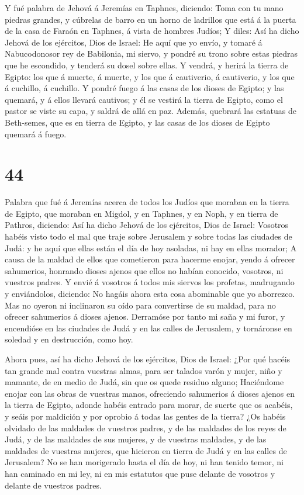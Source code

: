  Y fué palabra de Jehová á Jeremías en Taphnes, diciendo:
 Toma con tu mano piedras grandes, y cúbrelas de barro en un
horno de ladrillos que está á la puerta de la casa de Faraón en Taphnes,
á vista de hombres Judíos;  Y diles: Así ha dicho Jehová de
los ejércitos, Dios de Israel: He aquí que yo envío, y tomaré á
Nabucodonosor rey de Babilonia, mi siervo, y pondré su trono sobre estas
piedras que he escondido, y tenderá su dosel sobre ellas. 
Y vendrá, y herirá la tierra de Egipto: los que á muerte, á muerte, y
los que á cautiverio, á cautiverio, y los que á cuchillo, á cuchillo.
 Y pondré fuego á las casas de los dioses de Egipto; y las
quemará, y á ellos llevará cautivos; y él se vestirá la tierra de
Egipto, como el pastor se viste su capa, y saldrá de allá en paz.
 Además, quebrará las estatuas de Beth-semes, que es en
tierra de Egipto, y las casas de los dioses de Egipto quemará á fuego.

\hypertarget{section-43}{%
\section{44}\label{section-43}}

 Palabra que fué á Jeremías acerca de todos los Judíos que
moraban en la tierra de Egipto, que moraban en Migdol, y en Taphnes, y
en Noph, y en tierra de Pathros, diciendo:  Así ha dicho
Jehová de los ejércitos, Dios de Israel: Vosotros habéis visto todo el
mal que traje sobre Jerusalem y sobre todas las ciudades de Judá: y he
aquí que ellas están el día de hoy asoladas, ni hay en ellas morador;
 A causa de la maldad de ellos que cometieron para hacerme
enojar, yendo á ofrecer sahumerios, honrando dioses ajenos que ellos no
habían conocido, vosotros, ni vuestros padres.  Y envié á
vosotros á todos mis siervos los profetas, madrugando y enviándolos,
diciendo: No hagáis ahora esta cosa abominable que yo aborrezco.
 Mas no oyeron ni inclinaron su oído para convertirse de su
maldad, para no ofrecer sahumerios á dioses ajenos. 
Derramóse por tanto mi saña y mi furor, y encendióse en las ciudades de
Judá y en las calles de Jerusalem, y tornáronse en soledad y en
destrucción, como hoy.

 Ahora pues, así ha dicho Jehová de los ejércitos, Dios de
Israel: ¿Por qué hacéis tan grande mal contra vuestras almas, para ser
talados varón y mujer, niño y mamante, de en medio de Judá, sin que os
quede residuo alguno;  Haciéndome enojar con las obras de
vuestras manos, ofreciendo sahumerios á dioses ajenos en la tierra de
Egipto, adonde habéis entrado para morar, de suerte que os acabéis, y
seáis por maldición y por oprobio á todas las gentes de la tierra?
 ¿Os habéis olvidado de las maldades de vuestros padres, y
de las maldades de los reyes de Judá, y de las maldades de sus mujeres,
y de vuestras maldades, y de las maldades de vuestras mujeres, que
hicieron en tierra de Judá y en las calles de Jerusalem? 
No se han morigerado hasta el día de hoy, ni han tenido temor, ni han
caminado en mi ley, ni en mis estatutos que puse delante de vosotros y
delante de vuestros padres.


